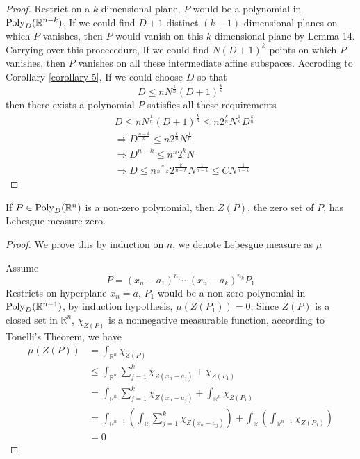\begin{proof}
Restrict on a $ k $-dimensional plane, $ P $ would be a polynomial in $ \operatorname{Poly}_{D}(\mathbb{R}^{n-k}) $, If we could find $ D+1 $ distinct $ (k-1) $-dimensional planes on which $ P $ vanishes, then $ P $ would vanish on this $ k $-dimensional plane by Lemma 14. Carrying over this procecedure, If we could find $ N(D+1)^{k} $ points on which $ P $ vanishes, then $ P $ vanishes on all these intermediate affine subspaces. Accroding to Corollary \ref{corollary 5}, If we could choose $ D $ so that
$$ D \leq nN^{\frac{1}{n}}(D+1)^{\frac{k}{n}} $$
then there exists a polynomial $ P $ satisfies all these requirements
\begin{align*}
&D \leq nN^{\frac{1}{n}}(D+1)^{\frac{k}{n}} \leq n2^{\frac{k}{n}}N^{\frac{1}{n}}D^{\frac{k}{n}} \\
&\Rightarrow D^{\frac{n-k}{n}} \leq n2^{\frac{k}{n}}N^{\frac{1}{n}} \\
&\Rightarrow D^{n-k} \leq n^{n}2^{k}N \\
&\Rightarrow D \leq n^{\frac{n}{n-k}}2^{\frac{k}{n-k}}N^{\frac{1}{n-k}} \leq CN^{\frac{1}{n-k}}
\end{align*}
\end{proof}

\begin{theorem}\label{theorem 16}
If $ P \in \operatorname{Poly}_{D}(\mathbb{R}^{n}) $ is a non-zero polynomial, then $ Z(P) $, the zero set of $ P $, has 
Lebesgue measure zero.
\end{theorem}

\begin{proof}
We prove this by induction on $ n $, we denote Lebesgue measure as $ \mu $ \par
Assume
$$ P = (x_{n}-a_{1})^{n_{1}} \cdots (x_{n}-a_{k})^{n_{k}} P_{1} $$
Restricts on hyperplane $ {x_{n} = a} $, $ P_{1} $ would be a non-zero polynomial in $\operatorname{Poly}_{D}(\mathbb{R}^{n-1}) $, by induction hypothesis, $ \mu(Z(P_{1})) = 0 $, 
Since $ Z(P) $ is a closed set in $ \mathbb{R}^{n} $, $ \chi _{Z(P)} $ is a nonnegative measurable function, according to Tonelli's Theorem, we have
\begin{equation*}
\begin{aligned}
\mu(Z(P)) &= \int_{\mathbb{R}^{n}} \chi _{Z(P)} \\
          &\leq \int_{\mathbb{R}^{n}} \sum_{j=1}^{k}\chi _{Z(x_{n} - a_{j})} + \chi _{Z(P_{1})} \\
          &= \int_{\mathbb{R}^{n}} \sum_{j=1}^{k}\chi _{Z(x_{n} - a_{j})} + \int_{\mathbb{R}^{n}} \chi _{Z(P_{1})} \\
          &= \int_{\mathbb{R}^{n-1}}\left(\int_{\mathbb{R}}\sum_{j=1}^{k}\chi _{Z(x_{n} - a_{j})}\right) + 
             \int_{\mathbb{R}}\left(\int_{\mathbb{R}^{n-1}} \chi _{Z(P_{1})}\right) \\
          &= 0
\end{aligned}
\end{equation*}
\end{proof}

